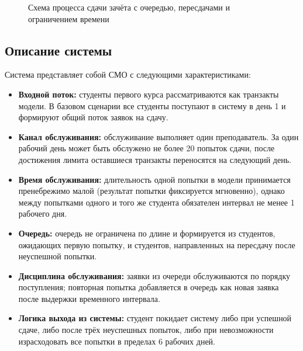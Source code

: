 \documentclass[a4paper, 14pt]{extarticle}
\begin{document}
\begin{figure}[H]
{
}
\caption{Схема процесса сдачи зачёта с очередью, пересдачами и ограничением времени}
\label{fig:flow}
\end{figure}

\subsection{Описание системы}
Система представляет собой СМО с следующими характеристиками:
\begin{itemize}
  \item \textbf{Входной поток:} студенты первого курса рассматриваются как транзакты модели. В базовом сценарии все студенты поступают в систему в день 1 и формируют общий поток заявок на сдачу.
  \item \textbf{Канал обслуживания:} обслуживание выполняет один преподаватель. За один рабочий день может быть обслужено не более 20 попыток сдачи, после достижения лимита оставшиеся транзакты переносятся на следующий день.
  \item \textbf{Время обслуживания:} длительность одной попытки в модели принимается пренебрежимо малой (результат попытки фиксируется мгновенно), однако между попытками одного и того же студента обязателен интервал не менее 1 рабочего дня.
  \item \textbf{Очередь:} очередь не ограничена по длине и формируется из студентов, ожидающих первую попытку, и студентов, направленных на пересдачу после неуспешной попытки.
  \item \textbf{Дисциплина обслуживания:} заявки из очереди обслуживаются по порядку поступления; повторная попытка добавляется в очередь как новая заявка после выдержки временного интервала.
  \item \textbf{Логика выхода из системы:} студент покидает систему либо при успешной сдаче, либо после трёх неуспешных попыток, либо при невозможности израсходовать все попытки в пределах 6 рабочих дней.
\end{itemize}
\end{document}
